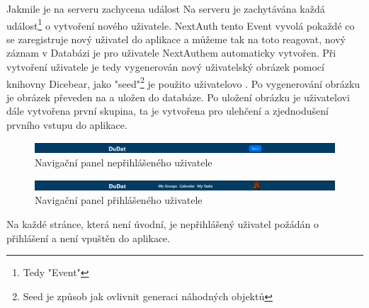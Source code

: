 Jakmile je na serveru zachycena událost Na serveru je zachytávána každá událost\footnote{Tedy "Event"} o vytvoření nového uživatele. NextAuth tento Event vyvolá pokaždé co se zaregistruje nový uživatel do aplikace a můžeme tak na toto reagovat, nový záznam v Databázi je pro uživatele NextAuthem automaticky vytvořen. Při vytvoření uživatele je tedy vygenerován nový uživatelský obrázek pomocí knihovny Dicebear, jako "seed"\footnote{Seed je způsob jak ovlivnit generaci náhodných objektů} je použito uživatelovo . Po vygenerování obrázku je obrázek převeden na  a uložen do databáze. Po uložení obrázku je uživatelovi dále vytvořena první skupina, ta je vytvořena pro ulehčení a zjednodušení prvního vstupu do aplikace.

\begin{figure}[hbt!]
	\includegraphics[width=1\linewidth]{img/neprihlasenyNavbar.png}
	\caption{Navigační panel nepřihlášeného uživatele}
\end{figure}
\begin{figure}[hbt!]
	\includegraphics[width=1\linewidth]{img/prihlasenyNavbar.png}
	\caption{Navigační panel přihlášeného uživatele}
\end{figure}
\clearpage
Na každé stránce, která není úvodní, je nepřihlášený uživatel požádán o přihlášení a není vpuštěn do aplikace.

